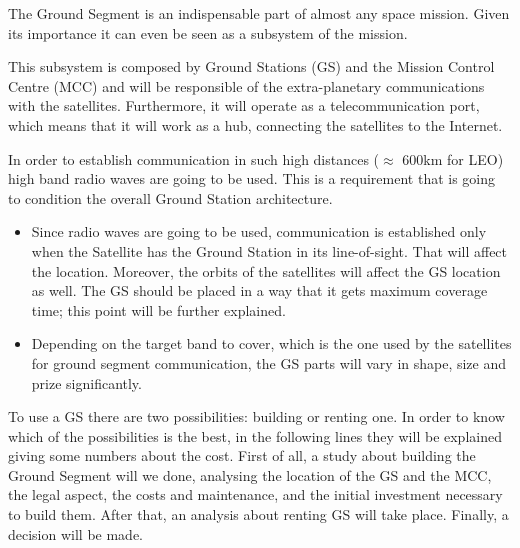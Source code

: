 The Ground Segment is an indispensable part of almost any space mission. Given its importance it can even be seen as a subsystem of the mission.

This subsystem is composed by Ground Stations (GS) and the Mission Control Centre (MCC) and will be responsible of the extra-planetary communications with the satellites. Furthermore, it will operate as a telecommunication port, which means that it will work as a hub, connecting the satellites to the Internet.

In order to establish communication in such high distances ($\approx$ 600km for LEO) high band radio waves are going to be used. This is a requirement that is going to condition the overall Ground Station architecture.
\begin{itemize}
\item Since radio waves are going to be used, communication is established only when the Satellite has the Ground Station in its line-of-sight. That will affect the location. Moreover, the orbits of the satellites will affect the GS location as well. The GS should be placed in a way that it gets maximum coverage time; this point will be further explained.
\item Depending on the target band to cover, which is the one used by the satellites for ground segment communication, the GS parts will vary in shape, size and prize significantly.
\end{itemize}

To use a GS there are two possibilities: building or renting one. In order to know which of the possibilities is the best, in the following lines they will be explained giving some numbers about the cost. First of all, a study about building the Ground Segment will we done, analysing the location of the GS and the MCC, the legal aspect, the costs and maintenance, and the initial investment necessary to build them. After that, an analysis about renting GS will take place. Finally, a decision will be made.